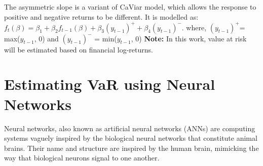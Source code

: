 \documentclass[a4paper,11pt,oneside]{book}
\begin{document}
\newline\newline
The asymmetric slope is a variant of CaViar model, which allows the response to positive and negative returns to be different. It is modelled as:\newline\newline
$f_{t}(\beta)= \beta_{1} +\beta_{2}f_{t-1}(\beta)+\beta_{3}(y_{t-1})^{+} + \beta_{4}(y_{t-1})^{-}$. where, $(y_{t-1})^{+}$= max($y_{t-1}$, 0) and $(y_{t-1})^{-}$ = min($y_{t-1}$, 0)
\newline\newline
\textbf{Note:} In this work, value at risk will be estimated based on financial log-returns.

\chapter{Estimating VaR using Neural Networks
}
Neural networks, also known as artificial neural networks (ANNs) are computing systems vaguely inspired by the biological neural networks that constitute animal brains. Their name and structure are inspired by the human brain, mimicking the way that biological neurons signal to one another.\newline\newline
\end{document}
